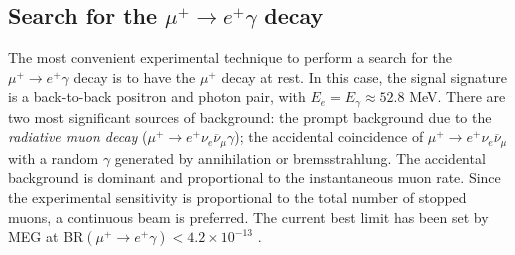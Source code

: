 \documentclass[12pt,a4paper,openright, oneside, titlepage]{book} %
\begin{document}
\begin{comment}
\begin{itemize}
\item Crystalbox \cite{Crystalbox:1984} \cite{Crystalbox:1988} was arguably the first 'modern' $\mu\rightarrow e\gamma$ experiment. It used a pulsed 800 MeV proton beam, the electron was tracked while the photon was detected with a Na(Ti) calorimeter: $\sim400$ Na(Ti) crystals surrounding a cylindrical drift chamber and plastic scintillation counters with no magnetic field. The upper limit achieved was $\Gamma(\mu^+\rightarrow e^+\gamma)/\Gamma(\mu^+\rightarrow e^+ \nu \overline{\nu})<4.9\times 10^{-11}$.
\item MEGA \cite{MEGA:1999} \cite{MEGA:2002}, like the previous experiment, was performed at Los Alamos. The cylindrical structure was kept and the apparatus was formed by an inner chamber, surrounding the stopping target, and seven smaller cylindrical chambers surrounding it (sometimes indicated as \textit{Snow White} ad \textit{Seven Dwarves} \cite{bob_cflv}). The limit set by this experiment was $1.2\times10^{-11}$ and the relatively poor improvement from its predecessor was mainly related to the reduced duty factor due to the pile-up.
\item SINDRUM \cite{SINDRUM} and SINDRUM II \cite{SINDRUMII} at were performed at the Paul Scherrer Institute. We will only describe the apparatus for SINDRUM II, in a following section, because it set the limit on the process Mu2e is going to test.
\item TRIUMF
\end{itemize}
\end{comment}

\subsection{Search for the $\mu^+ \rightarrow e^+ \gamma$ decay}
The most convenient experimental technique to perform a search for the $\mu^+ \rightarrow e^+ \gamma$ decay
is to have the $\mu^+$ decay at rest. In this case, the signal  
signature is a back-to-back positron and photon pair, with $E_e=E_\gamma\approx 52.8$ MeV. 
There are two most significant sources of background: 
the prompt background due to the \textit{radiative muon decay} 
($\mu^+\rightarrow e^+ \nu_e \overline{\nu}_\mu\gamma$); 
the accidental coincidence of $\mu^+\rightarrow e^+ \nu_e \overline{\nu}_\mu$ 
with a random $\gamma$ generated by annihilation or bremsstrahlung.
The accidental background is dominant and proportional to the instantaneous muon rate. 
Since the experimental sensitivity is proportional to the total number of stopped muons, 
a continuous beam is preferred.
The current best limit has been set by MEG at BR$(\mu^+\rightarrow e^+\gamma)<4.2\times10^{-13}$ \cite{MEG}.
\end{document}
